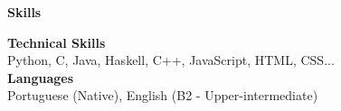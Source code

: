 \noindent\textbf{Skills}
\noindent\hrulefill
\vspace{0.25em}
\begin{adjustwidth}{1.5em}{0em}
\textbf{Technical Skills}\\
Python, C, Java, Haskell, C++, JavaScript, HTML, CSS...
\vspace{0.5em}
\\
\textbf{Languages}\\
Portuguese (Native), English (B2 - Upper-intermediate)
\end{adjustwidth}
\vspace{0.25em}